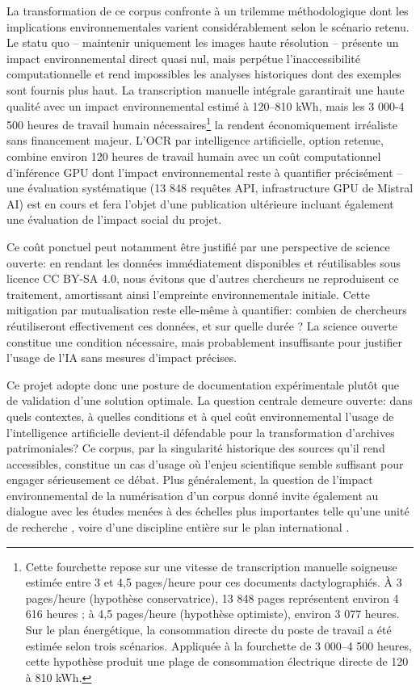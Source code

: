\documentclass[final,fra]{anthology-ch}         %
\begin{document}
La transformation de ce corpus confronte à un trilemme méthodologique
dont les implications environnementales varient considérablement selon
le scénario retenu. Le statu quo -- maintenir uniquement les images
haute résolution -- présente un impact environnemental direct quasi
nul, mais perpétue l'inaccessibilité computationnelle et rend
impossibles les analyses historiques dont des exemples sont fournis plus
haut. La transcription manuelle intégrale garantirait une haute qualité
avec un impact environnemental estimé à 120--810 kWh, mais les 3 000-4
500 heures de travail humain nécessaires\footnote{Cette fourchette
  repose sur une vitesse de transcription manuelle soigneuse estimée
  entre 3 et 4,5 pages/heure pour ces documents dactylographiés. À 3
  pages/heure (hypothèse conservatrice), 13 848 pages représentent
  environ 4 616 heures ; à 4,5 pages/heure (hypothèse optimiste),
  environ 3 077 heures. Sur le plan énergétique, la consommation directe
  du poste de travail a été estimée selon trois scénarios. Appliquée à
  la fourchette de 3 000--4 500 heures, cette hypothèse produit une
  plage de consommation électrique directe de 120 à 810 kWh.} la rendent
économiquement irréaliste sans financement majeur. L'OCR par
intelligence artificielle, option retenue, combine environ 120 heures de
travail humain avec un coût computationnel d'inférence GPU dont l'impact
environnemental reste à quantifier précisément -- une évaluation
systématique (13 848 requêtes API, infrastructure GPU de Mistral AI) est
en cours et fera l'objet d'une publication ultérieure incluant également
une évaluation de l'impact social du projet.

Ce coût ponctuel peut notamment être justifié par une perspective de
science ouverte: en rendant les données immédiatement disponibles et
réutilisables sous licence CC BY-SA 4.0, nous évitons que d'autres
chercheurs ne reproduisent ce traitement, amortissant ainsi l'empreinte
environnementale initiale. Cette mitigation par mutualisation reste
elle-même à quantifier: combien de chercheurs réutiliseront
effectivement ces données, et sur quelle durée ? La science ouverte
constitue une condition nécessaire, mais probablement insuffisante pour
justifier l'usage de l'IA sans mesures d'impact précises.

Ce projet adopte donc une posture de documentation expérimentale plutôt
que de validation d'une solution optimale. La question centrale demeure
ouverte: dans quels contextes, à quelles conditions et à quel coût
environnemental l'usage de l'intelligence artificielle devient-il
défendable pour la transformation d'archives patrimoniales? Ce corpus,
par la singularité historique des sources qu'il rend accessibles,
constitue un cas d'usage où l'enjeu scientifique semble suffisant pour
engager sérieusement ce débat. Plus généralement, la question de
l'impact environnemental de la numérisation d'un corpus donné invite
également au dialogue avec les études menées à des échelles plus
importantes telle qu'une unité de recherche \cite{CNRS_empreinte_2026}, 
voire d'une discipline entière sur le plan international \cite{knoedlseder_secnarios_2024}.
\end{document}
